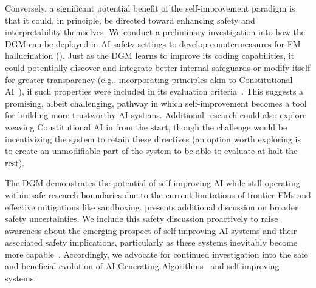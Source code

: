 Conversely, a significant potential benefit of the self-improvement paradigm is that it could, in principle, be directed toward enhancing safety and interpretability themselves. We conduct a preliminary investigation into how the DGM can be deployed in AI safety settings to develop countermeasures for FM hallucination (). Just as the DGM learns to improve its coding capabilities, it could potentially discover and integrate better internal safeguards or modify itself for greater transparency (e.g., incorporating principles akin to Constitutional AI~\citep{bai2022constitutional}), if such properties were included in its evaluation criteria~\citep{rosser2025agentbreeder}. This suggests a promising, albeit challenging, pathway in which self-improvement becomes a tool for building more trustworthy AI systems. Additional research could also explore weaving Constitutional AI in from the start, though the challenge would be incentivizing the system to retain these directives (an option worth exploring is to create an unmodifiable part of the system to be able to evaluate at halt the rest).

The DGM demonstrates the potential of self-improving AI while still operating within safe research boundaries due to the current limitations of frontier FMs and effective mitigations like sandboxing.  presents additional discussion on broader safety uncertainties. We include this safety discussion proactively to raise awareness about the emerging prospect of self-improving AI systems and their associated safety implications, particularly as these systems inevitably become more capable~\citep{yudkowsky2008artificial, bostrom2002a,ecoffet2020open, bengio2024managing,clune2019ai}. Accordingly, we advocate for continued investigation into the safe and beneficial evolution of AI-Generating Algorithms~\citep{clune2019ai} and self-improving systems.

